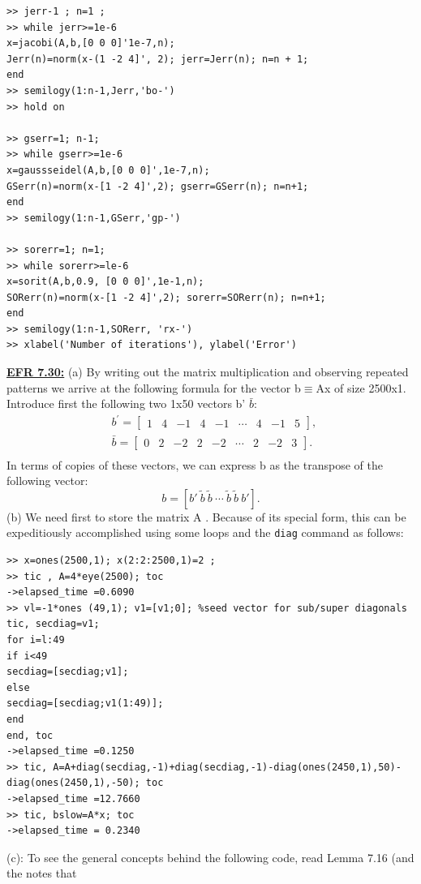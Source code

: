 \documentclass[../main.tex]{subfiles}
\begin{document}
\begin{lstlisting}[numbers=none,frame=none]
>> jerr-1 ; n=1 ; 
>> while jerr>=1e-6 
x=jacobi(A,b,[0 0 0]'1e-7,n); 
Jerr(n)=norm(x-(1 -2 4]', 2); jerr=Jerr(n); n=n + 1; 
end 
>> semilogy(1:n-1,Jerr,'bo-') 
>> hold on 

>> gserr=1; n-1; 
>> while gserr>=1e-6 
x=gaussseidel(A,b,[0 0 0]',1e-7,n); 
GSerr(n)=norm(x-[1 -2 4]',2); gserr=GSerr(n); n=n+1; 
end 
>> semilogy(1:n-1,GSerr,'gp-') 

>> sorerr=1; n=1; 
>> while sorerr>=le-6 
x=sorit(A,b,0.9, [0 0 0]',1e-1,n); 
SORerr(n)=norm(x-[1 -2 4]',2); sorerr=SORerr(n); n=n+1; 
end 
>> semilogy(1:n-1,SORerr, 'rx-') 
>> xlabel('Number of iterations'), ylabel('Error') 
\end{lstlisting} 
\textbf{\underline{EFR 7.30:}} (a) By writing out the matrix multiplication and observing repeated patterns we arrive 
at the following formula for the vector b$\equiv$Ax of size 2500x1. Introduce first the following two 
1x50 vectors b' $\bar{b}$: 
$$
\begin{aligned}
&b^{\prime}=\left[\begin{array}{lllllllll}
1 & 4 & -1 & 4 & -1 & \cdots & 4 & -1 & 5
\end{array}\right] \text {, }\\
&\bar{b}=\left[\begin{array}{lllllllll}
0 & 2 & -2 & 2 & -2 & \cdots & 2 & -2 & 3
\end{array}\right] \text {. }\\
\end{aligned}
$$
 In terms of copies of these vectors, we can express b as the transpose of the following vector: 
 $$
 b = [b' ~\tilde{b}~ \tilde{b}~ \cdots ~\tilde{b} ~\tilde{b }~b'].
 $$
 (b) We need first to store the matrix A . Because of its special form, this can be expeditiously 
accomplished using some loops and the \texttt{diag} command as follows:
\begin{lstlisting}[numbers=none,frame=none]
>> x=ones(2500,1); x(2:2:2500,1)=2 ; 
>> tic , A=4*eye(2500); toc 
->elapsed_time =0.6090 
>> vl=-1*ones (49,1); v1=[v1;0]; %seed vector for sub/super diagonals 
tic, secdiag=v1; 
for i=l:49 
if i<49 
secdiag=[secdiag;v1]; 
else 
secdiag=[secdiag;v1(1:49)]; 
end 
end, toc 
->elapsed_time =0.1250 
>> tic, A=A+diag(secdiag,-1)+diag(secdiag,-1)-diag(ones(2450,1),50)-diag(ones(2450,1),-50); toc 
->elapsed_time =12.7660 
>> tic, bslow=A*x; toc 
->elapsed_time = 0.2340
\end{lstlisting}
(c): To see the general concepts behind the following code, read Lemma 7.16 (and the notes that 
\end{document}
